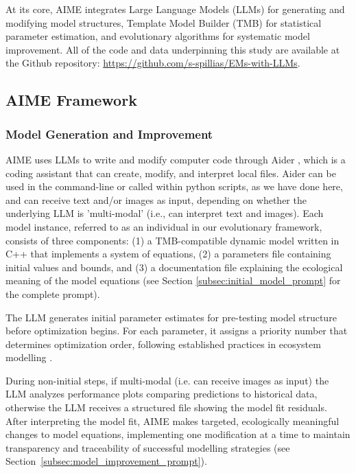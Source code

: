 At its core, AIME integrates Large Language Models (LLMs) for generating and modifying model structures, Template Model Builder (TMB) for statistical parameter estimation, and evolutionary algorithms for systematic model improvement. All of the code and data underpinning this study are available at the Github repository: \url{https://github.com/s-spillias/EMs-with-LLMs}.

\subsection{AIME Framework}

\subsubsection{Model Generation and Improvement}
AIME uses LLMs to write and modify computer code through Aider \citep{gauthier2024aider}, which is a coding assistant that can create, modify, and interpret local files. Aider can be used in the command-line or called within python scripts, as we have done here, and can receive text and/or images as input, depending on whether the underlying LLM is 'multi-modal' (i.e., can interpret text and images). Each model instance, referred to as an individual in our evolutionary framework, consists of three components: (1) a TMB-compatible dynamic model written in C++ that implements a system of equations, (2) a parameters file containing initial values and bounds, and (3) a documentation file explaining the ecological meaning of the model equations (see Section \ref{subsec:initial_model_prompt} for the complete prompt).

The LLM generates initial parameter estimates for pre-testing model structure before optimization begins. For each parameter, it assigns a priority number that determines optimization order, following established practices in ecosystem modelling \citep{Plaganyi_Punt_Hillary_Morello_Thebaud_Hutton_Pillans_Thorson_Fulton_Smith_et_al_2014}.

During non-initial steps, if multi-modal (i.e. can receive images as input) the LLM analyzes performance plots comparing predictions to historical data, otherwise the LLM receives a structured file showing the model fit residuals. After interpreting the model fit, AIME makes targeted, ecologically meaningful changes to model equations, implementing one modification at a time to maintain transparency and traceability of successful modelling strategies (see Section~\ref{subsec:model_improvement_prompt}).

